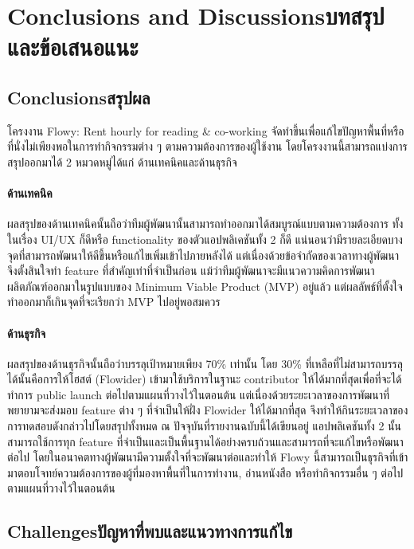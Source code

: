 \chapter{\ifenglish Conclusions and Discussions\else บทสรุปและข้อเสนอแนะ\fi}

\section{\ifenglish Conclusions\else สรุปผล\fi}

โครงงาน Flowy: Rent hourly for reading \& co-working จัดทำขึ้นเพื่อแก้ไขปัญหาพื้นที่หรือที่นั่งไม่เพียงพอในการทำกิจกรรมต่าง ๆ ตามความต้องการของผู้ใช้งาน โดยโครงงานนี้สามารถแบ่งการสรุปออกมาได้ 2 หมวดหมู่ได้แก่ ด้านเทคนิคและด้านธุรกิจ

\subsubsection{ด้านเทคนิค}
ผลสรุปของด้านเทคนิคนั้นถือว่าทีมผู้พัฒนานั้นสามารถทำออกมาได้สมบูรณ์แบบตามความต้องการ ทั้งในเรื่อง UI/UX ก็ดีหรือ functionality ของตัวแอปพลิเคชันทั้ง 2 ก็ดี แน่นอนว่ามีรายละเอียดบางจุดที่สามารถพัฒนาให้ดีขึ้นหรือแก้ไขเพิ่มเข้าไปภายหลังได้ แต่เนื่องด้วยข้อจำกัดของเวลาทางผู้พัฒนาจึงตั้งสินใจทำ feature ที่สำคัญเท่าที่จำเป็นก่อน แม้ว่าทีมผู้พัฒนาจะมีแนวความคิดการพัฒนาผลิตภัณฑ์ออกมาในรูปแบบของ Minimum Viable Product (MVP) อยู่แล้ว แต่ผลลัพธ์ที่ตั้งใจทำออกมาก็เกินจุดที่จะเรียกว่า MVP ไปอยู่พอสมควร

\subsubsection{ด้านธุรกิจ}
ผลสรุปของด้านธุรกิจนั้นถือว่าบรรลุเป้าหมายเพียง 70\% เท่านั้น โดย 30\% ที่เหลือที่ไม่สามารถบรรลุได้นั้นคือการให้โฮสต์ (Flowider) เข้ามาใช้บริการในฐานะ contributor ให้ได้มากที่สุดเพื่อที่จะได้ทำการ public launch ต่อไปตามแผนที่วางไว้ในตอนต้น แต่เนื่องด้วยระยะเวลาของการพัฒนาที่พยายามจะส่งมอบ feature ต่าง ๆ ที่จำเป็นให้ฝั่ง Flowider ให้ได้มากที่สุด จึงทำให้กินระยะเวลาของการทดสอบดังกล่าวไปโดยสรุปทั้งหมด ณ ปัจจุบันที่รายงานฉบับนี้ได้เขียนอยู่ แอปพลิเคชันทั้ง 2 นั้นสามารถใช้การทุก feature ที่จำเป็นและเป็นพื้นฐานได้อย่างครบถ้วนและสามารถที่จะแก้ไขหรือพัฒนาต่อไป โดยในอนาคตทางผู้พัฒนามีความตั้งใจที่จะพัฒนาต่อและทำให้ Flowy นี้สามารถเป็นธุรกิจที่เข้ามาตอบโจทย์ความต้องการของผู้ที่มองหาพื้นที่ในการทำงาน, อ่านหนังสือ หรือทำกิจกรรมอื่น ๆ ต่อไปตามแผนที่วางไว้ในตอนต้น

\section{\ifenglish Challenges\else ปัญหาที่พบและแนวทางการแก้ไข\fi}

